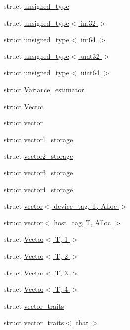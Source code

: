 \begin{DoxyCompactItemize}
struct \hyperlink{structcugar_1_1unsigned__type}{unsigned\+\_\+type}
\item 
struct \hyperlink{structcugar_1_1unsigned__type_3_01int32_01_4}{unsigned\+\_\+type$<$ int32 $>$}
\item 
struct \hyperlink{structcugar_1_1unsigned__type_3_01int64_01_4}{unsigned\+\_\+type$<$ int64 $>$}
\item 
struct \hyperlink{structcugar_1_1unsigned__type_3_01uint32_01_4}{unsigned\+\_\+type$<$ uint32 $>$}
\item 
struct \hyperlink{structcugar_1_1unsigned__type_3_01uint64_01_4}{unsigned\+\_\+type$<$ uint64 $>$}
\item 
struct \hyperlink{structcugar_1_1_variance__estimator}{Variance\+\_\+estimator}
\item 
struct \hyperlink{structcugar_1_1_vector}{Vector}
\item 
struct \hyperlink{structcugar_1_1vector}{vector}
\item 
struct \hyperlink{structcugar_1_1vector1__storage}{vector1\+\_\+storage}
\item 
struct \hyperlink{structcugar_1_1vector2__storage}{vector2\+\_\+storage}
\item 
struct \hyperlink{structcugar_1_1vector3__storage}{vector3\+\_\+storage}
\item 
struct \hyperlink{structcugar_1_1vector4__storage}{vector4\+\_\+storage}
\item 
struct \hyperlink{structcugar_1_1vector_3_01device__tag_00_01_t_00_01_alloc_01_4}{vector$<$ device\+\_\+tag, T, Alloc $>$}
\item 
struct \hyperlink{structcugar_1_1vector_3_01host__tag_00_01_t_00_01_alloc_01_4}{vector$<$ host\+\_\+tag, T, Alloc $>$}
\item 
struct \hyperlink{structcugar_1_1_vector_3_01_t_00_011_01_4}{Vector$<$ T, 1 $>$}
\item 
struct \hyperlink{structcugar_1_1_vector_3_01_t_00_012_01_4}{Vector$<$ T, 2 $>$}
\item 
struct \hyperlink{structcugar_1_1_vector_3_01_t_00_013_01_4}{Vector$<$ T, 3 $>$}
\item 
struct \hyperlink{structcugar_1_1_vector_3_01_t_00_014_01_4}{Vector$<$ T, 4 $>$}
\item 
struct \hyperlink{structcugar_1_1vector__traits}{vector\+\_\+traits}
\item 
struct \hyperlink{structcugar_1_1vector__traits_3_01char_01_4}{vector\+\_\+traits$<$ char $>$}
\item 

\end{DoxyCompactItemize}

